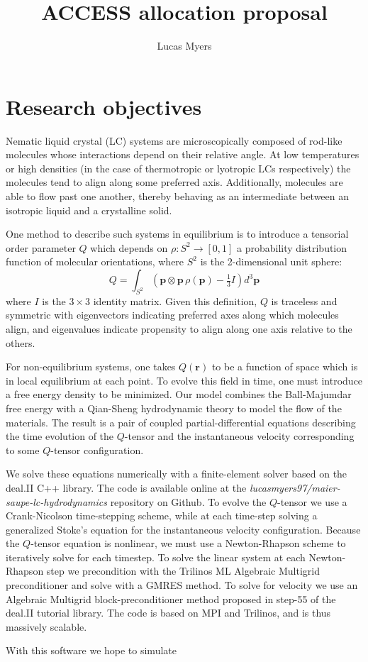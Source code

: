 \documentclass[reqno]{article}
\begin{document}
\title{ACCESS allocation proposal}
\author{Lucas Myers}
\maketitle

\section{Research objectives}
Nematic liquid crystal (LC) systems are microscopically composed of rod-like molecules whose interactions depend on their relative angle.
At low temperatures or high densities (in the case of thermotropic or lyotropic LCs respectively) the molecules tend to align along some preferred axis. 
Additionally, molecules are able to flow past one another, thereby behaving as an intermediate between an isotropic liquid and a crystalline solid. \cite{selinger_introduction_2016}

One method to describe such systems in equilibrium is to introduce a tensorial order parameter $Q$ which depends on $\rho: S^2 \to [0, 1]$ a probability distribution function of molecular orientations, where $S^2$ is the 2-dimensional unit sphere:
\begin{equation}
    Q
    =
    \int_{S^2} \left(
        \mathbf{p} \otimes \mathbf{p} \, \rho(\mathbf{p}) - \tfrac13 I
    \right)
    d^3 \mathbf{p}
\end{equation}
where $I$ is the $3\times 3$ identity matrix.
Given this definition, $Q$ is traceless and symmetric with eigenvectors indicating preferred axes along which molecules align, and eigenvalues indicate propensity to align along one axis relative to the others. 

For non-equilibrium systems, one takes $Q(\mathbf{r})$ to be a function of space which is in local equilibrium at each point.
To evolve this field in time, one must introduce a free energy density to be minimized.
Our model combines the Ball-Majumdar free energy with a Qian-Sheng hydrodynamic theory to model the flow of the materials.
The result is a pair of coupled partial-differential equations describing the time evolution of the $Q$-tensor and the instantaneous velocity corresponding to some $Q$-tensor configuration. 

We solve these equations numerically with a finite-element solver based on the deal.II C++ library.
The code is available online at the \textit{lucasmyers97/maier-saupe-lc-hydrodynamics} repository on Github.
To evolve the $Q$-tensor we use a Crank-Nicolson time-stepping scheme, while at each time-step solving a generalized Stoke's equation for the instantaneous velocity configuration.
Because the $Q$-tensor equation is nonlinear, we must use a Newton-Rhapson scheme to iteratively solve for each timestep.
To solve the linear system at each Newton-Rhapson step we precondition with the Trilinos ML Algebraic Multigrid preconditioner and solve with a GMRES method.
To solve for velocity we use an Algebraic Multigrid block-preconditioner method proposed in step-55 of the deal.II tutorial library. 
The code is based on MPI and Trilinos, and is thus massively scalable. 

With this software we hope to simulate 


{}

% 
% 
% 
\end{document}
